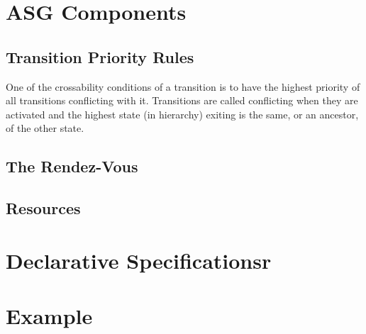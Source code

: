 \documentclass[../main.tex]{subfiles}
\begin{document}
\section{ASG Components}

\subsection{Transition Priority Rules}
One of the crossability conditions of a transition is to have the highest priority of all transitions conflicting with it. Transitions are called conflicting when they are activated and the highest state (in hierarchy) exiting is the same, or an ancestor, of the other state.

\subsection{The Rendez-Vous}
\subsection{Resources}

\section{Declarative Specificationsr}

\section{Example}
\end{document}
